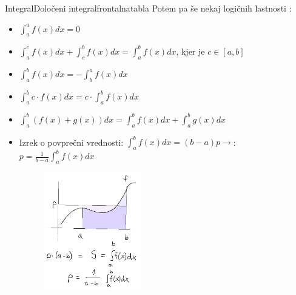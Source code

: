 \begin{priprava}{}{}{Integral}{Določeni integral}{frontalna}{tabla}
Potem pa še nekaj logičnih lastnosti :


\begin{itemize}
    \item $ \int_a^a f(x) dx = 0 $
    \item $ \int_a^c f(x) dx + \int_c^b f(x) dx = \int_a^b f(x) dx $, kjer je $ c \in [a, b] $
    \item $ \int_a^b f(x) dx = - \int_b^a f(x) dx $ 
    \item $ \int_a^b c \cdot f(x) dx = c \cdot \int_a^b f(x) dx $
    \item $\int_a^b (f(x) + g(x)) dx = \int_a^b f(x) dx + \int_a^b g(x) dx $
    \item Izrek o povprečni vrednosti: $ \int_a^b f(x) dx = (b-a)p \rightarrow $: $ p = \frac{1}{b - a} \int_a^b f(x) dx $

\newpage

\begin{figure}[h]
    \centering
    \includegraphics[width=0.4\textwidth]{slike/povprecna_vrednost.png}
\end{figure}

\end{itemize}



\end{priprava}
